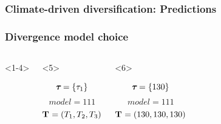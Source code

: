 \begin{frame}[t]
    \frametitle<1-4>{Climate-driven diversification: Predictions}
    \frametitle<5->{Divergence model choice}

    \vspace{-0.5cm}
    \begin{columns}[c]
        \begin{onlyenv}<1-4>
            \begin{minipage}[c][0.5\textheight][c]{\linewidth}
            \end{minipage}
        \end{onlyenv}
        \begin{onlyenv}<5>
            \begin{minipage}[c][0.5\textheight][c]{\linewidth}
                \begin{displaybox}[0.95\linewidth]
                    \begin{minipage}[c][0.45\textheight][c]{0.95\linewidth}
                        \[
                            \boldsymbol{\tau_{}} = \{\tau_{1}\}
                        \]\vspace{0mm}
                        \[
                            model = 111
                        \]\vspace{0mm}
                        \[
                            \mathbf{T_{}} = (T_{1},T_{2},T_{3})
                        \]\vspace{0mm}
                    \end{minipage}
                \end{displaybox}
            \end{minipage}
        \end{onlyenv}
        \begin{onlyenv}<6>
            \begin{minipage}[c][0.5\textheight][c]{\linewidth}
                \begin{displaybox}[0.95\linewidth]
                    \begin{minipage}[c][0.45\textheight][c]{0.95\linewidth}
                        \[
                            \boldsymbol{\tau_{}} = \{130\}
                        \]\vspace{0mm}
                        \[
                            model = 111
                        \]\vspace{0mm}
                        \[
                            \mathbf{T_{}} = (130,130,130)
\]
\end{minipage}
\end{displaybox}
\end{minipage}
\end{onlyenv}
\end{columns}
\end{frame}
